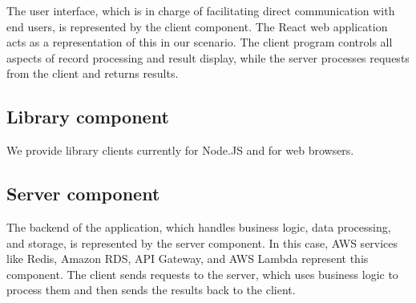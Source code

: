 \documentclass{article}
\begin{document}
\hspace{1cm}The user interface, which is in charge of facilitating direct communication with end users, is represented by the client component. The React web application acts as a representation of this in our scenario. The client program controls all aspects of record processing and result display, while the server processes requests from the client and returns results.

\subsection{Library component}

\hspace{1cm}We provide library clients currently for Node.JS and for web browsers.

\subsection{Server component}

\hspace{1cm}The backend of the application, which handles business logic, data processing, and storage, is represented by the server component. In this case, AWS services like Redis, Amazon RDS, API Gateway, and AWS Lambda represent this component. The client sends requests to the server, which uses business logic to process them and then sends the results back to the client.
\end{document}
